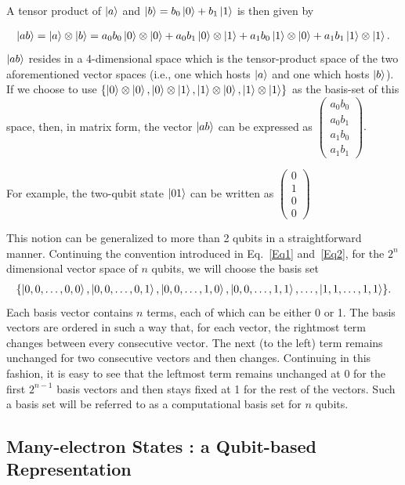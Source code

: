 \documentclass[12pt,oneside]{book}
\begin{document}
A tensor product of $\ket{a}$ and $\ket{b}=b_0\ket{0}+b_1\ket{1}$ is then given by

\begin{align}\label{Eq2}
    \ket{ab}=\ket{a}\otimes\ket{b}=a_0b_0 \ket{0}\otimes\ket{0} + a_0b_1 \ket{0}\otimes\ket{1} +a_1b_0 \ket{1}\otimes\ket{0} + a_1b_1\ket{1}\otimes\ket{1}.
\end{align}
$\ket{ab}$ resides in a 4-dimensional space which is the tensor-product space of the two aforementioned vector spaces (i.e., one which hosts $\ket{a}$ and one which hosts $\ket{b}$). If we choose to use $\{\ket{0}\otimes\ket{0} , \ket{0}\otimes\ket{1}, \ket{1}\otimes\ket{0}, \ket{1}\otimes\ket{1}\}$ as the basis-set of this space, then, in matrix form, the vector $\ket{ab}$ can be expressed as $\begin{pmatrix}
    a_0b_0\\
    a_0b_1\\
    a_1b_0\\
    a_1b_1
\end{pmatrix}.$

For example, the two-qubit state $\ket{01}$ can be written as $\begin{pmatrix}
    0\\
    1\\
    0\\
    0
\end{pmatrix}$

This notion can be generalized to more than 2 qubits in a straightforward manner. Continuing the convention introduced in Eq.~\ref{Eq1} and~\ref{Eq2}, for the $2^n$ dimensional vector space of $n$ qubits, we will choose the basis set
\begin{align*}
\{\ket{0,0,\hdots,0,0} , \ket{0,0,\hdots,0,1} , \ket{0,0,\hdots,1,0}, \ket{0,0,\hdots,1,1},\hdots ,\ket{1,1,\hdots,1,1} \}.
\end{align*}
Each basis vector contains $n$ terms, each of which can be either 0 or 1. The basis vectors are ordered in such a way that, for each vector, the rightmost term changes between every consecutive vector. The next (to the left) term remains unchanged for two consecutive vectors and then changes. Continuing in this fashion, it is easy to see that the leftmost term remains unchanged at 0 for the first $2^{n-1}$ basis vectors and then stays fixed at 1 for the rest of the vectors. Such a basis set will be referred to as a computational basis set for $n$ qubits.

\subsection*{Many-electron States : a Qubit-based Representation}
\end{document}

